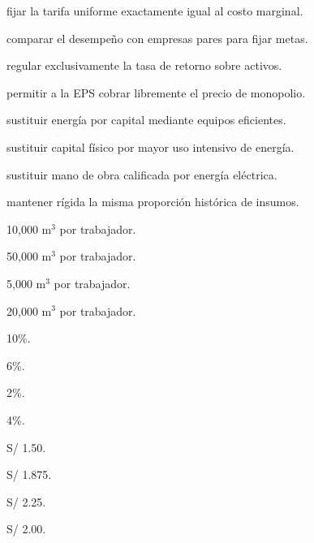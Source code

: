 \begin{opts}
    \item fijar la tarifa uniforme exactamente igual al costo marginal.
    \item comparar el desempeño con empresas pares para fijar metas.
    \item regular exclusivamente la tasa de retorno sobre activos.
    \item permitir a la EPS cobrar libremente el precio de monopolio.
\end{opts}

\begin{opts}
    \item sustituir energía por capital mediante equipos eficientes.
    \item sustituir capital físico por mayor uso intensivo de energía.
    \item sustituir mano de obra calificada por energía eléctrica.
    \item mantener rígida la misma proporción histórica de insumos.
\end{opts}

\begin{opts}
    \item 10,000 m$^3$ por trabajador.
    \item 50,000 m$^3$ por trabajador.
    \item 5,000 m$^3$ por trabajador.
    \item 20,000 m$^3$ por trabajador.
\end{opts}

\begin{opts}
    \item 10\%.
    \item 6\%.
    \item 2\%.
    \item 4\%.
\end{opts}

\begin{opts}
    \item S/ 1.50.
    \item S/ 1.875.
    \item S/ 2.25.
    \item S/ 2.00.
\end{opts}

